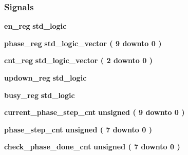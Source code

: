 \subsubsection*{Signals}
 \begin{DoxyCompactItemize}
\item 
{\bf en\+\_\+reg} {\bfseries \textcolor{comment}{std\+\_\+logic}\textcolor{vhdlchar}{ }} 
\item 
{\bf phase\+\_\+reg} {\bfseries \textcolor{comment}{std\+\_\+logic\+\_\+vector}\textcolor{vhdlchar}{ }\textcolor{vhdlchar}{(}\textcolor{vhdlchar}{ }\textcolor{vhdlchar}{ } \textcolor{vhdldigit}{9} \textcolor{vhdlchar}{ }\textcolor{keywordflow}{downto}\textcolor{vhdlchar}{ }\textcolor{vhdlchar}{ } \textcolor{vhdldigit}{0} \textcolor{vhdlchar}{ }\textcolor{vhdlchar}{)}\textcolor{vhdlchar}{ }} 
\item 
{\bf cnt\+\_\+reg} {\bfseries \textcolor{comment}{std\+\_\+logic\+\_\+vector}\textcolor{vhdlchar}{ }\textcolor{vhdlchar}{(}\textcolor{vhdlchar}{ }\textcolor{vhdlchar}{ } \textcolor{vhdldigit}{2} \textcolor{vhdlchar}{ }\textcolor{keywordflow}{downto}\textcolor{vhdlchar}{ }\textcolor{vhdlchar}{ } \textcolor{vhdldigit}{0} \textcolor{vhdlchar}{ }\textcolor{vhdlchar}{)}\textcolor{vhdlchar}{ }} 
\item 
{\bf updown\+\_\+reg} {\bfseries \textcolor{comment}{std\+\_\+logic}\textcolor{vhdlchar}{ }} 
\item 
{\bf busy\+\_\+reg} {\bfseries \textcolor{comment}{std\+\_\+logic}\textcolor{vhdlchar}{ }} 
\item 
{\bf current\+\_\+phase\+\_\+step\+\_\+cnt} {\bfseries \textcolor{comment}{unsigned}\textcolor{vhdlchar}{ }\textcolor{vhdlchar}{(}\textcolor{vhdlchar}{ }\textcolor{vhdlchar}{ } \textcolor{vhdldigit}{9} \textcolor{vhdlchar}{ }\textcolor{keywordflow}{downto}\textcolor{vhdlchar}{ }\textcolor{vhdlchar}{ } \textcolor{vhdldigit}{0} \textcolor{vhdlchar}{ }\textcolor{vhdlchar}{)}\textcolor{vhdlchar}{ }} 
\item 
{\bf phase\+\_\+step\+\_\+cnt} {\bfseries \textcolor{comment}{unsigned}\textcolor{vhdlchar}{ }\textcolor{vhdlchar}{(}\textcolor{vhdlchar}{ }\textcolor{vhdlchar}{ } \textcolor{vhdldigit}{7} \textcolor{vhdlchar}{ }\textcolor{keywordflow}{downto}\textcolor{vhdlchar}{ }\textcolor{vhdlchar}{ } \textcolor{vhdldigit}{0} \textcolor{vhdlchar}{ }\textcolor{vhdlchar}{)}\textcolor{vhdlchar}{ }} 
\item 
{\bf check\+\_\+phase\+\_\+done\+\_\+cnt} {\bfseries \textcolor{comment}{unsigned}\textcolor{vhdlchar}{ }\textcolor{vhdlchar}{(}\textcolor{vhdlchar}{ }\textcolor{vhdlchar}{ } \textcolor{vhdldigit}{7} \textcolor{vhdlchar}{ }\textcolor{keywordflow}{downto}\textcolor{vhdlchar}{ }\textcolor{vhdlchar}{ } \textcolor{vhdldigit}{0} \textcolor{vhdlchar}{ }\textcolor{vhdlchar}{)}\textcolor{vhdlchar}{ }} 

\end{DoxyCompactItemize}
